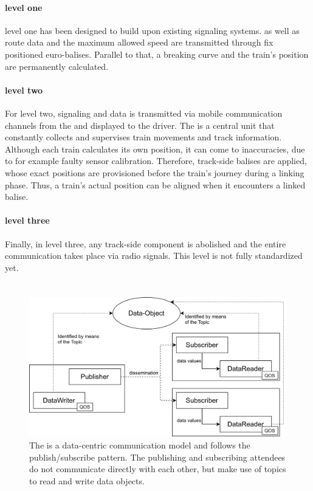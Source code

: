 \paragraph{ level one}
 level one has been designed to build upon existing signaling systems.
 as well as route data and the maximum allowed speed are transmitted through fix positioned euro-balises.
Parallel to that, a breaking curve and the train's position are permanently calculated.

\paragraph{ level two}
For  level two, signaling and  data is transmitted via mobile communication channels from the  and displayed to the driver.
The  is a central unit that constantly collects and supervises train movements and track information.
Although each train calculates its own position, it can come to inaccuracies, due to for example faulty sensor calibration.
Therefore, track-side balises are applied, whose exact positions are provisioned before the train's journey during a linking phase.
Thus, a train's actual position can be aligned when it encounters a linked balise.

\paragraph{ level three}
Finally, in  level three, any track-side component is abolished and the entire communication takes place via radio signals.
This  level is not fully standardized yet.

\section{}

\begin{figure}[!hb]
	\centering
	\includegraphics[width=0.75\linewidth]{images/DDSStructure}
	\caption{The  is a data-centric communication model and follows the publish/subscribe pattern. The publishing and subscribing attendees do not communicate directly with each other, but make use of topics to read and write data objects.}
	\label{fig:DDSStructure}
\end{figure}

